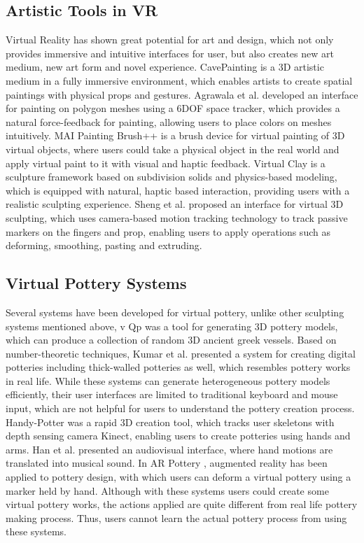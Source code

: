 \subsection{Artistic Tools in VR}
\label{sec:2.2}
Virtual Reality has shown great potential for art and design, which not only provides immersive and intuitive interfaces for user, but also creates new art medium, new art form and novel experience\cite{laviola20113d}. CavePainting \cite{keefe2001cavepainting} is a 3D artistic medium in a fully immersive environment, which enables artists to create spatial paintings with physical props and gestures. Agrawala et al.\cite{agrawala19953d} developed an interface for painting on polygon meshes using a 6DOF space tracker, which provides a natural force-feedback for painting, allowing users to place colors on meshes intuitively. MAI Painting Brush++ \cite{otsuki2017brush} is a brush device for virtual painting of 3D virtual objects, where users could take a physical object in the real world and apply virtual paint to it with visual and haptic feedback. Virtual Clay \cite{mcdonnell2001virtual} is a sculpture framework based on subdivision solids and physics-based modeling, which is equipped with natural, haptic based interaction, providing users with a realistic sculpting experience. Sheng et al. \cite{sheng2006interface} proposed an interface for virtual 3D sculpting, which uses camera-based motion tracking technology to track passive markers on the fingers and prop, enabling users to apply operations such as deforming, smoothing, pasting and extruding.

\subsection{Virtual Pottery Systems}
\label{sec:2.3}


Several systems have been developed for virtual pottery, unlike other sculpting systems mentioned above, v
Qp \cite{koutsoudis2009qp} was a tool for generating 3D pottery models, which can produce a collection of random 3D ancient greek vessels.
Based on number-theoretic techniques, Kumar et al. \cite{kumar2011wheel} presented a system for creating digital potteries including thick-walled potteries as well, which resembles pottery works in real life.
While these systems can generate heterogeneous pottery models efficiently, their user interfaces are limited to traditional keyboard and mouse input, which are not helpful for users to understand the pottery creation process.
Handy-Potter \cite{murugappan2013handy} was a rapid 3D creation tool, which tracks user skeletons with depth sensing camera Kinect, enabling users to create potteries using hands and arms.
Han et al. \cite{han2014virtual} presented an audiovisual interface, where hand motions are translated into musical sound.
In AR Pottery \cite{han2007ar}, augmented reality has been applied to pottery design, with which users can deform a virtual pottery using a marker held by hand.
Although with these systems users could create some virtual pottery works, the actions applied are quite different from real life pottery making process. Thus, users cannot learn the actual pottery process from using these systems.

